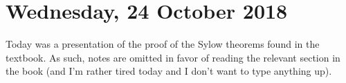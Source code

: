 \section{Wednesday, 24 October 2018}

Today was a presentation of the proof of the Sylow theorems found in the textbook. As such, notes are omitted in favor of reading the relevant section in the book (and I'm rather tired today and I don't want to type anything up).